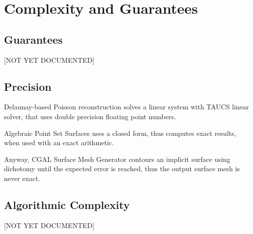 \section{Complexity and Guarantees}


\subsection{Guarantees}

[NOT YET DOCUMENTED]


\subsection{Precision}

Delaunay-based Poisson reconstruction solves a linear system with TAUCS
linear solver, that uses double precision floating point
numbers.

Algebraic Point Set Surfaces uses a closed form, thus computes exact results, when used with an exact arithmetic.

Anyway, CGAL Surface Mesh Generator contours an implicit surface using dichotomy
until the expected error is reached, thus the output surface mesh is never exact.


\subsection{Algorithmic Complexity}

[NOT YET DOCUMENTED]

